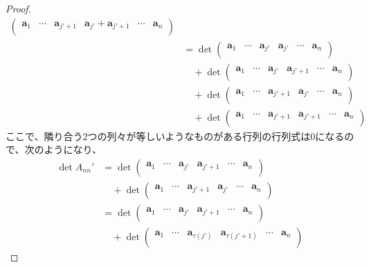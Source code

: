 \documentclass[dvipdfmx]{jsarticle}
\begin{document}
\begin{proof}
\begin{align*}
\begin{pmatrix}
\mathbf{a}_{1} & \cdots & \mathbf{a}_{j' + 1} & \mathbf{a}_{j'} + \mathbf{a}_{j' + 1} & \cdots & \mathbf{a}_{n} \\
\end{pmatrix}\\
&= \det\begin{pmatrix}
\mathbf{a}_{1} & \cdots & \mathbf{a}_{j'} & \mathbf{a}_{j'} & \cdots & \mathbf{a}_{n} \\
\end{pmatrix} \\
&\quad + \det\begin{pmatrix}
\mathbf{a}_{1} & \cdots & \mathbf{a}_{j'} & \mathbf{a}_{j' + 1} & \cdots & \mathbf{a}_{n} \\
\end{pmatrix} \\
&\quad + \det\begin{pmatrix}
\mathbf{a}_{1} & \cdots & \mathbf{a}_{j' + 1} & \mathbf{a}_{j'} & \cdots & \mathbf{a}_{n} \\
\end{pmatrix} \\
&\quad + \det\begin{pmatrix}
\mathbf{a}_{1} & \cdots & \mathbf{a}_{j' + 1} & \mathbf{a}_{j' + 1} & \cdots & \mathbf{a}_{n} \\
\end{pmatrix}
\end{align*}
ここで、隣り合う2つの列々が等しいようなものがある行列の行列式は0になるので、次のようになり、
\begin{align*}
\det A_{nn}' &= \det\begin{pmatrix}
\mathbf{a}_{1} & \cdots & \mathbf{a}_{j'} & \mathbf{a}_{j' + 1} & \cdots & \mathbf{a}_{n} \\
\end{pmatrix} \\
&\quad + \det\begin{pmatrix}
\mathbf{a}_{1} & \cdots & \mathbf{a}_{j' + 1} & \mathbf{a}_{j'} & \cdots & \mathbf{a}_{n} \\
\end{pmatrix}\\
&= \det\begin{pmatrix}
\mathbf{a}_{1} & \cdots & \mathbf{a}_{j'} & \mathbf{a}_{j' + 1} & \cdots & \mathbf{a}_{n} \\
\end{pmatrix} \\
&\quad + \det\begin{pmatrix}
\mathbf{a}_{1} & \cdots & \mathbf{a}_{\tau\left( j' \right)} & \mathbf{a}_{\tau\left( j' + 1 \right)} & \cdots & \mathbf{a}_{n} \\

\end{pmatrix}
\end{align*}
\end{proof}
\end{document}
